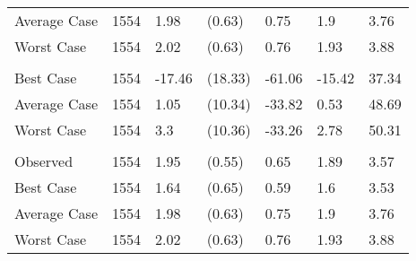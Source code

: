 \begin{tabular}[t]{lllllll}
\hspace{1em}\hspace{1em}Average Case & 1554 & 1.98 & (0.63) & 0.75 & 1.9 & \vphantom{1} 3.76\\
\hspace{1em}\hspace{1em}Worst Case & 1554 & 2.02 & (0.63) & 0.76 & 1.93 & \vphantom{1} 3.88\\
\addlinespace[0.3em]
\multicolumn{7}{l}{\textbf{\% Change Average Price}}\\
\hspace{1em}\hspace{1em}Best Case & 1554 & -17.46 & (18.33) & -61.06 & -15.42 & 37.34\\
\hspace{1em}\hspace{1em}Average Case & 1554 & 1.05 & (10.34) & -33.82 & 0.53 & 48.69\\
\hspace{1em}\hspace{1em}Worst Case & 1554 & 3.3 & (10.36) & -33.26 & 2.78 & 50.31\\
\addlinespace[0.3em]
\multicolumn{7}{l}{\textbf{Median Price}}\\
\hspace{1em}\hspace{1em}Observed & 1554 & 1.95 & (0.55) & 0.65 & 1.89 & 3.57\\
\hspace{1em}\hspace{1em}Best Case & 1554 & 1.64 & (0.65) & 0.59 & 1.6 & 3.53\\
\hspace{1em}\hspace{1em}Average Case & 1554 & 1.98 & (0.63) & 0.75 & 1.9 & 3.76\\
\hspace{1em}\hspace{1em}Worst Case & 1554 & 2.02 & (0.63) & 0.76 & 1.93 & 3.88\\
\bottomrule
\end{tabular}
